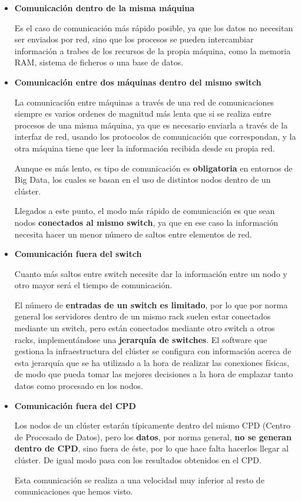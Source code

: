\begin{itemize}
	\item \textbf{Comunicación dentro de la misma máquina}
	
	Es el caso de comunicación más rápido posible, ya que los datos no necesitan ser enviados por red, sino que los procesos se pueden intercambiar información a trabes de los recursos de la propia máquina, como la memoria RAM, sistema de ficheros o una base de datos.
	
	\item \textbf{Comunicación entre dos máquinas dentro del mismo switch}
	
	La comunicación entre máquinas a través de una red de comunicaciones siempre es varios ordenes de magnitud más lenta que si se realiza entre procesos de una misma máquina, ya que es necesario enviarla a través de la interfaz de red, usando los protocolos de comunicación que correspondan, y la otra máquina tiene que leer la información recibida desde su propia red.
	
	Aunque es más lento, es tipo de comunicación es \textbf{obligatoria} en entornos de Big Data, los cuales se basan en el uso de distintos nodos dentro de un clúster.
	
	Llegados a este punto, el modo más rápido de comunicación es que sean nodos \textbf{conectados al mismo switch}, ya que en ese caso la información necesita hacer un menor número de saltos entre elementos de red.
	
	\item \textbf{Comunicación fuera del switch}
	
	Cuanto más saltos entre switch necesite dar la información entre un nodo y otro mayor será el tiempo de comunicación. 
	
	El número de \textbf{entradas de un switch es limitado}, por lo que por norma general los servidores dentro de un mismo rack suelen estar conectados mediante un switch, pero están conectados mediante otro switch a otros racks, implementándose una \textbf{jerarquía de switches}. El software que gestiona la infraestructura del clúster se configura con información acerca de esta jerarquía que se ha utilizado a la hora de realizar las conexiones físicas, de modo que pueda tomar las mejores decisiones a la hora de emplazar tanto datos como procesado en los nodos.
	
	\item \textbf{Comunicación fuera del CPD}
	
	Los nodos de un clúster estarán típicamente dentro del mismo CPD (Centro de Procesado de Datos), pero los \textbf{datos}, por norma general, \textbf{no se generan dentro de CPD}, sino fuera de éste, por lo que hace falta hacerlos llegar al clúster. De igual modo pasa con los resultados obtenidos en el CPD. 
	
	Esta comunicación se realiza a una velocidad muy inferior al resto de comunicaciones que hemos visto.
\end{itemize}

